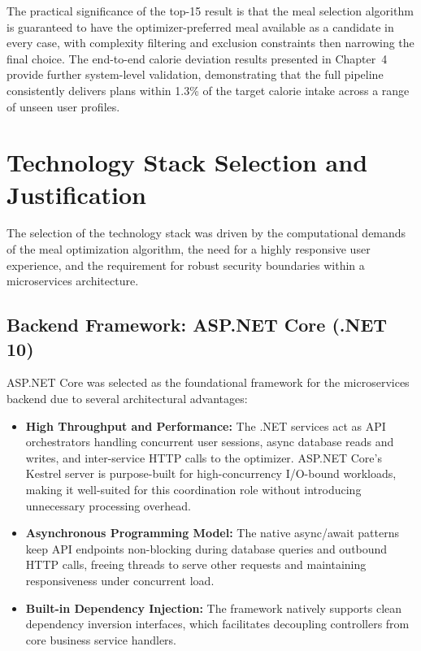 The practical significance of the top-15 result is that the meal selection algorithm
is guaranteed to have the optimizer-preferred meal available as a candidate in every
case, with complexity filtering and exclusion constraints then narrowing the final
choice. The end-to-end calorie deviation results presented in Chapter~4 provide
further system-level validation, demonstrating that the full pipeline consistently
delivers plans within 1.3\% of the target calorie intake across a range of unseen
user profiles.

\section{Technology Stack Selection and Justification}

The selection of the technology stack was driven by the computational demands of the 
meal optimization algorithm, the need for a highly responsive user experience, and the 
requirement for robust security boundaries within a microservices architecture. 

\subsection{Backend Framework: ASP.NET Core (.NET 10)}
ASP.NET Core was selected as the foundational framework for the microservices backend due 
to several architectural advantages:
\begin{itemize}
    \item \textbf{High Throughput and Performance:} The .NET services act as API
    orchestrators handling concurrent user sessions, async database reads and writes,
    and inter-service HTTP calls to the optimizer. ASP.NET Core's Kestrel server is
    purpose-built for high-concurrency I/O-bound workloads, making it well-suited for
    this coordination role without introducing unnecessary processing overhead.
    \item \textbf{Asynchronous Programming Model:} The native async/await patterns
    keep API endpoints non-blocking during database queries and outbound HTTP calls,
    freeing threads to serve other requests and maintaining responsiveness under
    concurrent load.
    \item \textbf{Built-in Dependency Injection:} The framework natively supports 
    clean dependency inversion interfaces, which facilitates decoupling controllers 
    from core business service handlers.
\end{itemize}


